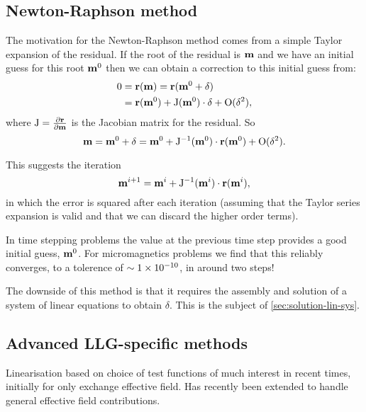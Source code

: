 \subsection{Newton-Raphson method}
\label{sec:newt-raph}

\newcommand{\resi}{\rv}
\newcommand{\jac}{\mathrm{J}}
\newcommand{\nowm}{\mv^0}
\newcommand{\nextm}{\mv}
\newcommand{\corr}{\delta}

The motivation for the Newton-Raphson method comes from a simple Taylor expansion of the residual. If the root of the residual is $\nextm$ and we have an initial guess for this root $\nowm$ then we can obtain a correction to this initial guess from:
\begin{equation}
  \begin{aligned}
    0 &= \resi(\nextm) = \resi(\nowm + \corr) \\
    &= \resi(\nowm) + \jac(\nowm) \cdot \corr + \order{\corr^2},
  \end{aligned}
\end{equation}
where $\jac = \pd{\resi}{\mv}$ is the Jacobian matrix for the residual.
So
\begin{equation}
  \label{eq:49}
  \nextm = \nowm + \corr = \nowm + \jac^{-1}(\nowm) \cdot \resi(\nowm) + \order{\corr^2}.
\end{equation}

This suggests the iteration
\begin{equation}
  \mv^{i+1} = \mv^i + \jac^{-1}(\mv^i) \cdot \resi(\mv^i),
\end{equation}
in which the error is squared after each iteration (assuming that the Taylor series expansion is valid and that we can discard the higher order terms).

In time stepping problems the value at the previous time step provides a good initial guess, $\mathbf{m}^0$.
For micromagnetics problems we find that this reliably converges, to a tolerence of $\sim1\times 10^{-10}$, in around two steps!

The downside of this method is that it requires the assembly and solution of a system of linear equations to obtain $\corr$.
This is the subject of \autoref{sec:solution-lin-sys}.


\subsection{Advanced LLG-specific methods}
\label{sec:advanced-lin}

Linearisation based on choice of test functions of much interest in recent times, initially for only exchange effective field\cite{Alouges2008}.
Has recently been extended to handle general effective field contributions\cite{Banas2012}.

